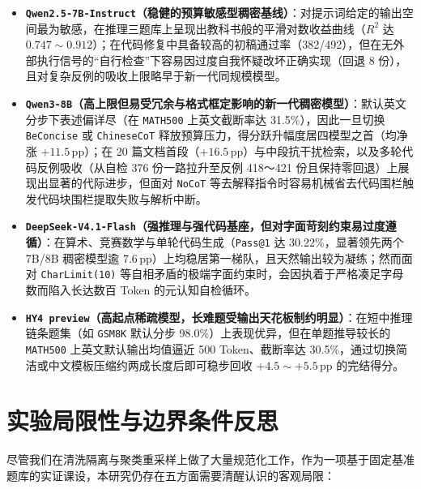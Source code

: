 \begin{itemize}
  \item \textbf{\texttt{Qwen2.5-7B-Instruct}（稳健的预算敏感型稠密基线）}：对提示词给定的输出空间最为敏感，在推理三题库上呈现出教科书般的平滑对数收益曲线（$R^2$ 达 $0.747\sim 0.912$）；在代码修复中具备较高的初稿通过率（382/492），但在无外部执行信号的“自行检查”下容易因过度自我怀疑改坏正确实现（回退 8 份），且对复杂反例的吸收上限略早于新一代同规模模型。
  \item \textbf{\texttt{Qwen3-8B}（高上限但易受冗余与格式框定影响的新一代稠密模型）}：默认英文分步下表述偏详尽（在 \texttt{MATH500} 上英文截断率达 31.5\%），因此一旦切换 \texttt{BeConcise} 或 \texttt{ChineseCoT} 释放预算压力，得分跃升幅度居四模型之首（均净涨 $+11.5$\,pp）；在 20 篇文档首段（$+16.5$\,pp）与中段抗干扰检索，以及多轮代码反例吸收（从自检 376 份一路拉升至反例 418～421 份且保持零回退）上展现出显著的代际进步，但面对 \texttt{NoCoT} 等去解释指令时容易机械省去代码围栏触发代码块围栏提取失败与解析中断。
  \item \textbf{\texttt{DeepSeek-V4.1-Flash}（强推理与强代码基座，但对字面苛刻约束易过度遵循）}：在算术、竞赛数学与单轮代码生成（\texttt{Pass@1} 达 30.22\%，显著领先两个 7B/8B 稠密模型逾 $7.6$\,pp）上均稳居第一梯队，且天然输出较为凝练；然而面对 \texttt{CharLimit(10)} 等自相矛盾的极端字面约束时，会因执着于严格凑足字母数而陷入长达数百 Token 的元认知自检循环。
  \item \textbf{\texttt{HY4 preview}（高起点稀疏模型，长难题受输出天花板制约明显）}：在短中推理链条题集（如 \texttt{GSM8K} 默认分步 98.0\%）上表现优异，但在单题推导较长的 \texttt{MATH500} 上英文默认输出均值逼近 500 Token、截断率达 30.5\%，通过切换简洁或中文模板压缩约两成长度后即可稳步回收 $+4.5\sim +5.5$\,pp 的完结得分。
\end{itemize}

\section{实验局限性与边界条件反思}

尽管我们在清洗隔离与聚类重采样上做了大量规范化工作，作为一项基于固定基准题库的实证课设，本研究仍存在五方面需要清醒认识的客观局限：

